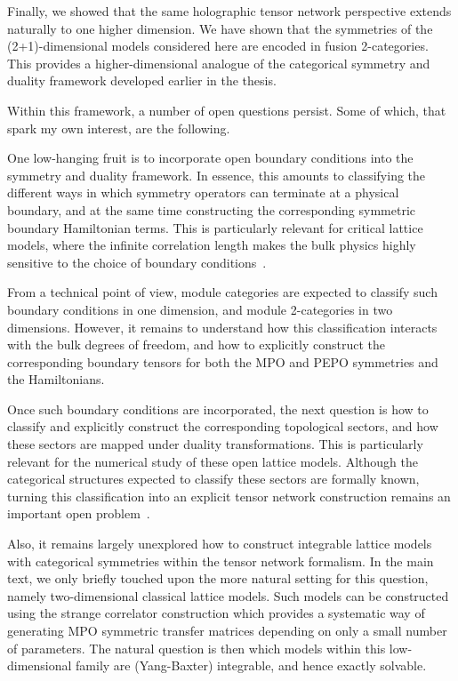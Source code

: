Finally, we showed that the same holographic tensor network perspective extends naturally to one higher dimension. We have shown that the symmetries of the (2+1)-dimensional models considered here are encoded in fusion 2-categories. This provides a higher-dimensional analogue of the categorical symmetry and duality framework developed earlier in the thesis.

\bigskip\noindent Within this framework, a number of open questions persist. Some of which, that spark my own interest, are the following.

One low-hanging fruit is to incorporate open boundary conditions into the symmetry and duality framework. In essence, this amounts to classifying the different ways in which symmetry operators can terminate at a physical boundary, and at the same time constructing the corresponding symmetric boundary Hamiltonian terms. This is particularly relevant for critical lattice models, where the infinite correlation length makes the bulk physics highly sensitive to the choice of boundary conditions~\cite{Fuchs2002,Thorngren2019,Choi2023,Lootens2022}.

From a technical point of view, module categories are expected to classify such boundary conditions in one dimension, and module 2-categories in two dimensions. However, it remains to understand how this classification interacts with the bulk degrees of freedom, and how to explicitly construct the corresponding boundary tensors for both the MPO and PEPO symmetries and the Hamiltonians.

Once such boundary conditions are incorporated, the next question is how to classify and explicitly construct the corresponding topological sectors, and how these sectors are mapped under duality transformations. This is particularly relevant for the numerical study of these open lattice models. Although the categorical structures expected to classify these sectors are formally known, turning this classification into an explicit tensor network construction remains an important open problem~\cite{Bullivant2020,Bullivant2021,Lootens2022}.

Also, it remains largely unexplored how to construct integrable lattice models with categorical symmetries within the tensor network formalism. In the main text, we only briefly touched upon the more natural setting for this question, namely two-dimensional classical lattice models. Such models can be constructed using the strange correlator construction which provides a systematic way of generating MPO symmetric transfer matrices depending on only a small number of parameters. The natural question is then which models within this low-dimensional family are (Yang-Baxter) integrable, and hence exactly solvable.

